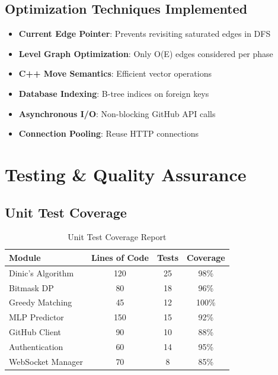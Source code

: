 \documentclass[12pt,a4paper]{article}
\begin{document}
\subsection{Optimization Techniques Implemented}

\begin{itemize}
    \item \textbf{Current Edge Pointer}: Prevents revisiting saturated edges in DFS
    \item \textbf{Level Graph Optimization}: Only O(E) edges considered per phase
    \item \textbf{C++ Move Semantics}: Efficient vector operations
    \item \textbf{Database Indexing}: B-tree indices on foreign keys
    \item \textbf{Asynchronous I/O}: Non-blocking GitHub API calls
    \item \textbf{Connection Pooling}: Reuse HTTP connections
\end{itemize}

\section{Testing \& Quality Assurance}

\subsection{Unit Test Coverage}

\begin{table}[H]
\centering
\caption{Unit Test Coverage Report}
\label{tab:test_coverage}
\begin{tabular}{|l|c|c|c|}
\hline
\textbf{Module} & \textbf{Lines of Code} & \textbf{Tests} & \textbf{Coverage} \\ \hline
Dinic's Algorithm & 120 & 25 & 98\% \\ \hline
Bitmask DP & 80 & 18 & 96\% \\ \hline
Greedy Matching & 45 & 12 & 100\% \\ \hline
MLP Predictor & 150 & 15 & 92\% \\ \hline
GitHub Client & 90 & 10 & 88\% \\ \hline
Authentication & 60 & 14 & 95\% \\ \hline
WebSocket Manager & 70 & 8 & 85\% \\ \hline
\end{tabular}
\end{table}
\end{document}
